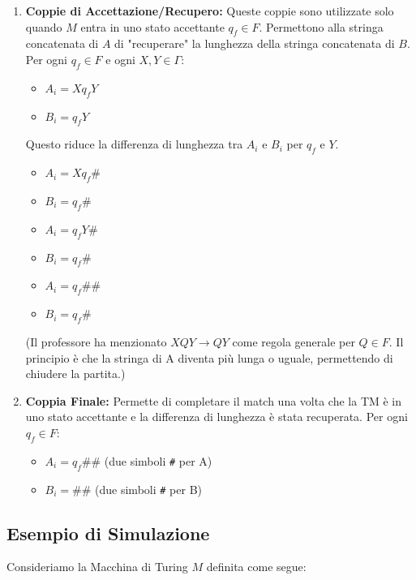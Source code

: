\documentclass[a4paper]{article}
\theoremstyle{definition} %
\theoremstyle{remark} %
\begin{document}
\begin{enumerate}
    \item \textbf{Coppie di Accettazione/Recupero:}
    Queste coppie sono utilizzate solo quando $M$ entra in uno stato accettante $q_f \in F$. Permettono alla stringa concatenata di $A$ di "recuperare" la lunghezza della stringa concatenata di $B$.
    Per ogni $q_f \in F$ e ogni $X, Y \in \Gamma$:
    \begin{itemize}
        \item $A_i = Xq_f Y$
        \item $B_i = q_f Y$
    \end{itemize}
    Questo riduce la differenza di lunghezza tra $A_i$ e $B_i$ per $q_f$ e $Y$.
    \begin{itemize}
        \item $A_i = Xq_f \#$
        \item $B_i = q_f \#$
    \end{itemize}
    \begin{itemize}
        \item $A_i = q_f Y \#$
        \item $B_i = q_f \#$
    \end{itemize}
    \begin{itemize}
        \item $A_i = q_f \# \#$
        \item $B_i = q_f \#$
    \end{itemize}
    (Il professore ha menzionato $XQY \to QY$ come regola generale per $Q \in F$. Il principio è che la stringa di A diventa più lunga o uguale, permettendo di chiudere la partita.)

    \item \textbf{Coppia Finale:}
    Permette di completare il match una volta che la TM è in uno stato accettante e la differenza di lunghezza è stata recuperata.
    Per ogni $q_f \in F$:
    \begin{itemize}
        \item $A_i = q_f \# \#$ (due simboli \texttt{\#} per A)
        \item $B_i = \# \#$ (due simboli \texttt{\#} per B)
    \end{itemize}
\end{enumerate}

\subsection{Esempio di Simulazione}

Consideriamo la Macchina di Turing $M$ definita come segue:
\end{document}
